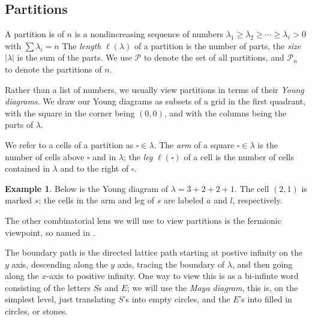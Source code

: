 \documentclass{amsart}[12pt]
\theoremstyle{definition}
\newtheorem{example}[dummy]{Example}
\newcommand{\PP}{\mathcal{P}} %
\begin{document}
\subsection{Partitions}


A partition is of $n$ is a nondincreasing sequence of numbers $\lambda_1\geq \lambda_2\geq \cdots \geq \lambda_\ell > 0$ with $\sum \lambda_i=n$  The \emph{length} $\ell(\lambda)$ of a partition is the number of parts, the \emph{size} $|\lambda|$ is the sum of the parts.  We use $\PP$ to denote the set of all partitions, and $\PP_n$ to denote the partitions of $n$.

Rather than a list of numbers, we usually view partitions in terms of their \emph{Young diagrams}.  We draw our Young diagrams as subsets of a grid in the first quadrant, with the square in the corner being $(0,0)$, and with the columns being the parts of $\lambda$.  

We refer to a cells of a partition as $\square\in\lambda$.  The \emph{arm} of a square $\square\in\lambda$ is the number of cells above $\square$ and in $\lambda$; the \emph{leg} $\ell(\square)$ of a cell is the number of cells contained in $\lambda$ and to the right of $\square$.

\begin{example}
Below is the Young diagram of $\lambda=3+2+2+1$.  The cell $(2,1)$ is marked $s$; the cells in the arm and leg of $s$ are labeled $a$ and $l$, respectively.
\begin{center}
\end{center}
\end{example}

The other combinatorial lens we will use to view partitions is the fermionic viewpoint, so named in .  

The boundary path is the directed lattice path starting at postive infinity on the $y$ axis, descending along the $y$ axis, tracing the boundary of $\lambda$, and then going along the $x$-axis to positive infinity.  One way to view this is as a bi-infinte word consisting of the letters $S$s and $E$; we will use the \emph{Maya diagram}, this is, on the simplest level, just translating $S$'s into empty circles, and the $E$'s into filled in circles, or stones.  
\end{document}
